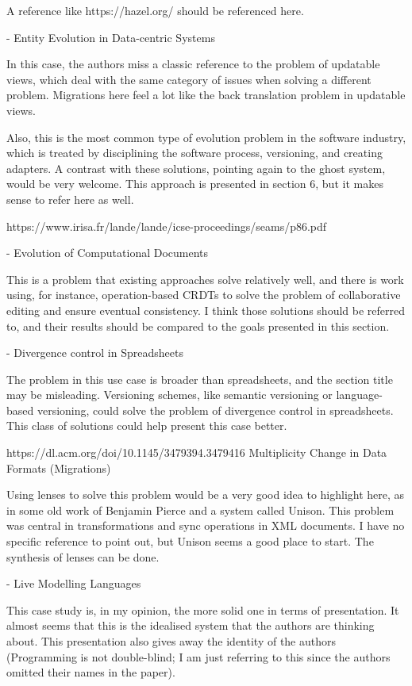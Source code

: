 A reference like https://hazel.org/ should be referenced here.

- Entity Evolution in Data-centric Systems

In this case, the authors miss a classic reference to the problem of updatable views, which deal with the same category of issues when solving a different problem. Migrations here feel a lot like the back translation problem in updatable views.

Also, this is the most common type of evolution problem in the software industry, which is treated by disciplining the software process, versioning, and creating adapters. A contrast with these solutions, pointing again to the ghost system, would be very welcome. This approach is presented in section 6, but it makes sense to refer here as well.

https://www.irisa.fr/lande/lande/icse-proceedings/seams/p86.pdf

- Evolution of Computational Documents

This is a problem that existing approaches solve relatively well, and there is work using, for instance, operation-based CRDTs to solve the problem of collaborative editing and ensure eventual consistency. I think those solutions should be referred to, and their results should be compared to the goals presented in this section.

- Divergence control in Spreadsheets

The problem in this use case is broader than spreadsheets, and the section title may be misleading. Versioning schemes, like semantic versioning or language-based versioning, could solve the problem of divergence control in spreadsheets. This class of solutions could help present this case better.

https://dl.acm.org/doi/10.1145/3479394.3479416
Multiplicity Change in Data Formats (Migrations)

Using lenses to solve this problem would be a very good idea to highlight here, as in some old work of Benjamin Pierce and a system called Unison. This problem was central in transformations and sync operations in XML documents. I have no specific reference to point out, but Unison seems a good place to start. The synthesis of lenses can be done.

- Live Modelling Languages

This case study is, in my opinion, the more solid one in terms of presentation. It almost seems that this is the idealised system that the authors are thinking about. This presentation also gives away the identity of the authors (Programming is not double-blind; I am just referring to this since the authors omitted their names in the paper).

